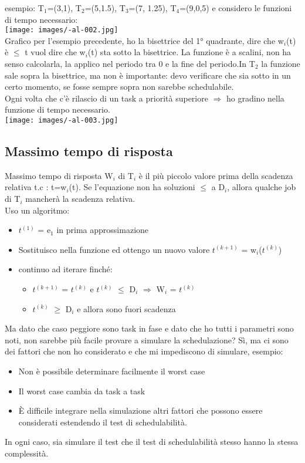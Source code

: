 \documentclass{article}
\begin{document}
esempio: T$_{1}$=(3,1), T$_{2}$=(5,1.5), T$_{3}$=(7, 1.25), T$_{4}$=(9,0,5) e considero le funzioni di tempo necessario:\\
\texttt{[image: images/-al-002.jpg]}\\
Grafico per l'esempio precedente, ho la bisettrice del 1° quadrante, dire che w$_{i}$(t) è $\leq$ t vuol dire che w$_{i}$(t) sta sotto la bisettrice. La funzione è a scalini, non ha senso calcolarla, la applico nel periodo tra 0 e la fine del periodo.In T$_{2}$ la funzione sale sopra la bisettrice, ma non è importante: devo verificare che sia sotto in un certo momento, se fosse sempre sopra non sarebbe schedulabile.\\ Ogni volta che c'è rilascio di un task a priorità superiore $\Rightarrow$ ho gradino nella funzione di tempo necessario.\\
\texttt{[image: images/-al-003.jpg]}\\
\subsection{Massimo tempo di risposta}
Massimo tempo di risposta W$_{i}$ di T$_{i}$ è il più piccolo valore prima della scadenza relativa t.c : t=w$_{i}$(t). Se l'equazione non ha soluzioni $\leq$ a D$_{i}$, allora qualche job di T$_{i}$ mancherà la scadenza relativa.\\ Uso un algoritmo:\\
\begin{itemize}
\item $t^(1)$ = e$_{1}$ in prima approssimazione
\item  Sostituisco nella funzione ed ottengo un nuovo valore $t^(k+1)$ = w$_{i}$($t^(k)$)
\item continuo ad iterare finché: 
\begin{itemize}
\item $t^(k+1)$ = $t^(k)$ e $t^(k)$ $\leq$ D$_{i}$ $\Rightarrow$ W$_{i}$ = $t^(k)$
\item $t^(k)$ $\geq$ D$_{i}$ e allora sono fuori scadenza
\end{itemize}
\end{itemize}
Ma dato che caso peggiore sono task in fase e dato che ho tutti i parametri sono noti, non sarebbe più facile provare a simulare la schedulazione? Sì, ma ci sono dei fattori che non ho considerato e che mi impediscono di simulare, esempio:
\begin{itemize}
\item Non è possibile determinare facilmente il worst case
\item Il worst case cambia da task a task
\item È difficile integrare nella simulazione altri fattori che possono essere considerati estendendo il test di schedulabilità.
\end{itemize}
In ogni caso, sia simulare il test che il test di schedulabilità stesso hanno la stessa complessità.
\end{document}
